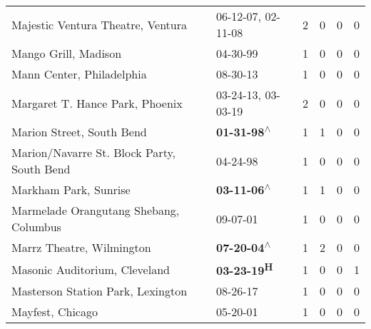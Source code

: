 \begin{supertabular}{p{0.4\textwidth}p{0.3\textwidth}p{0.05\textwidth}p{0.05\textwidth}p{0.05\textwidth}p{0.05\textwidth}}
                                            Majestic Ventura Theatre, Ventura &                                      06-12-07\textsuperscript{}, 02-11-08\textsuperscript{} &  2 &  0 &  0 &  0 \\
                                                         Mango Grill, Madison &                                                                  04-30-99\textsuperscript{} &  1 &  0 &  0 &  0 \\
                                                    Mann Center, Philadelphia &                                                                  08-30-13\textsuperscript{} &  1 &  0 &  0 &  0 \\
                                              Margaret T. Hance Park, Phoenix &                                      03-24-13\textsuperscript{}, 03-03-19\textsuperscript{} &  2 &  0 &  0 &  0 \\
                                                    Marion Street, South Bend &                                                 \textbf{01-31-98\textsuperscript{$\wedge$}} &  1 &  1 &  0 &  0 \\
                                   Marion/Navarre St. Block Party, South Bend &                                                                  04-24-98\textsuperscript{} &  1 &  0 &  0 &  0 \\
                                                        Markham Park, Sunrise &                                                 \textbf{03-11-06\textsuperscript{$\wedge$}} &  1 &  1 &  0 &  0 \\
                                       Marmelade Orangutang Shebang, Columbus &                                                                  09-07-01\textsuperscript{} &  1 &  0 &  0 &  0 \\
                                                    Marrz Theatre, Wilmington &                                                 \textbf{07-20-04\textsuperscript{$\wedge$}} &  1 &  2 &  0 &  0 \\
                                                Masonic Auditorium, Cleveland &                                                        \textbf{03-23-19\textsuperscript{H}} &  1 &  0 &  0 &  1 \\
                                            Masterson Station Park, Lexington &                                                                  08-26-17\textsuperscript{} &  1 &  0 &  0 &  0 \\
                                                             Mayfest, Chicago &                                                                  05-20-01\textsuperscript{} &  1 &  0 &  0 &  0 \\

\end{supertabular}
